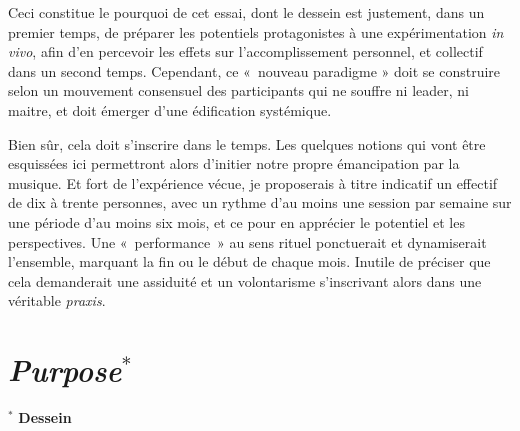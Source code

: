 \bigskip
Ceci constitue le pourquoi de cet essai, dont le dessein est justement, dans un premier temps, de préparer les potentiels protagonistes à une expérimentation \textit{in vivo}, afin d'en percevoir les effets sur l'accomplissement personnel, et collectif dans un second temps. Cependant, ce \hbox{« nouveau} paradigme » doit se construire selon un mouvement consensuel des participants qui ne souffre ni leader, ni  maitre, et doit émerger d'une édification systémique. 

Bien sûr, cela doit s'inscrire dans le temps. Les quelques notions qui vont être esquissées ici permettront alors d'initier notre propre émancipation par la musique. 
Et fort de l'expérience vécue, je proposerais à titre indicatif un effectif de dix à trente personnes, avec un rythme d'au moins une session par semaine sur une période d'au moins six mois, et ce pour en apprécier le potentiel et les perspectives. 
Une \hbox{« performance »} au sens rituel ponctuerait et dynamiserait l'ensemble, marquant la fin ou le début de chaque mois. Inutile de préciser que cela demanderait une assiduité et un volontarisme s'inscrivant alors dans une véritable \textit{praxis}. 

\section*{\textsl{Purpose}$^\ast$}
$^\ast$ \textbf{Dessein}
\label{purpose}

